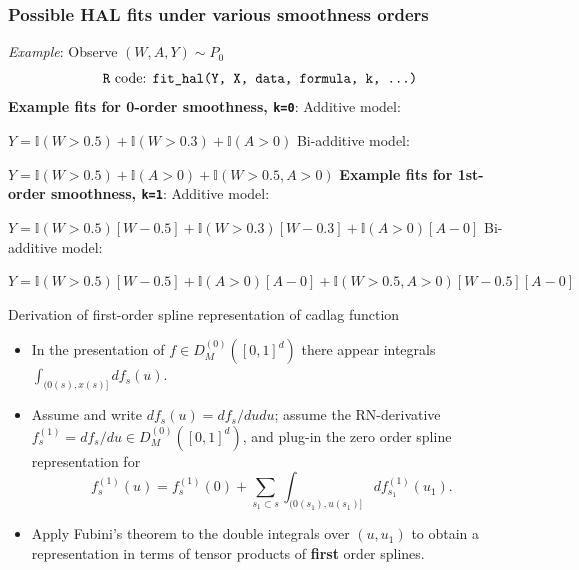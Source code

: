 \documentclass[t]{beamer}
\begin{document}
\begin{frame}
\frametitle{Possible HAL fits under various smoothness orders}
\textit{Example}: Observe $(W, A, Y) \sim P_0$
$$\text{\texttt{R} code: \texttt{fit\_hal(Y, X, data, formula, k, ...)}} $$
\textbf{Example fits for 0-order smoothness, \texttt{k=0}}: \newline
    Additive model:

    $Y = \mathbb{I}(W>0.5) + \mathbb{I}(W > 0.3) + \mathbb{I}(A>0)$ \newline
    Bi-additive model:

    $Y = \mathbb{I}(W>0.5) + \mathbb{I}(A>0)  + \mathbb{I}(W>0.5, A>0)$
    \newline
    \newline
\textbf{Example fits for 1st-order smoothness, \texttt{k=1}}: \newline
Additive model:

$Y = \mathbb{I}(W>0.5)[W - 0.5] + \mathbb{I}(W>0.3)[W - 0.3] + \mathbb{I}(A>0)[A-0]$
  \newline
 Bi-additive model:

 $Y = \mathbb{I}(W>0.5)[W - 0.5] + \mathbb{I}(A>0)[A-0]  + \mathbb{I}(W>0.5, A>0)[W - 0.5][A - 0]$ \newline
\end{frame}

\begin{frame}{Derivation of first-order spline representation of cadlag function}
\begin{itemize}
\item In the presentation of $f\in D^{(0)}_M([0,1]^d)$ there appear integrals
$\int_{(0(s),x(s)]} df_s(u)$.
\item Assume and write $df_s(u)=df_s/du du$; assume the RN-derivative $f_s^{(1)}=df_s/du\in D^{(0)}_M([0,1]^d)$, and plug-in the zero order spline representation for
\[
  f_s^{(1)}(u)=f_s^{(1)}(0)+\sum_{s_1\subset s}\int_{(0(s_1),u(s_1)]}
  df_{s_1}^{(1)}(u_1).
\]
\item Apply Fubini's theorem to the double integrals over $(u,u_1)$ to obtain
a representation in terms of tensor products of {\bf first} order splines.
\end{itemize}
\end{frame}
\end{document}
